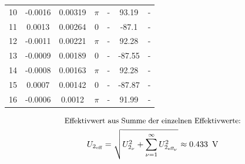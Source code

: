 \documentclass[a4paper, 12pt]{article}
\begin{document}
\begin{table}[H]
\begin{center}
\begin{tabular}{@{}ccccccc@{}}
        10    & -0.0016                             & 0.00319                       & $\pi$  &                 -              & 93.19                            &              -                    \\
        11    & 0.0013                              & 0.00264                       & 0      &                 -              & -87.1                            &                -                  \\
        12    & -0.0011                             & 0.00221                       & $\pi$  &                 -              & 92.28                            &               -                   \\
        13    & -0.0009                             & 0.00189                       & 0      &                 -              & -87.55                           &               -                   \\
        14    & -0.0008                             & 0.00163                       & $\pi$  &                 -              & 92.28                            &               -                   \\
        15    & 0.0007                              & 0.00142                       & 0      &                 -              & -87.87                           &                -                  \\
        16    & -0.0006                             & 0.0012                        & $\pi$  &                  -             & 91.99                            &               -                   \\ \bottomrule
        \end{tabular}
        \end{center}
        \end{table}

      \begin{gather*}
        \text{\small Effektivwert aus Summe der einzelnen Effektivwerte:}\\
        U_{2_{\text{eff}}} = \sqrt{ U_{2_\nu}^2 + \sum_{\nu=1}^{\infty}{U_{2_{{\text{eff}}_\nu}}^2}} \approx 0.433 \,\ \si{\volt}
      \end{gather*}
\end{document}
